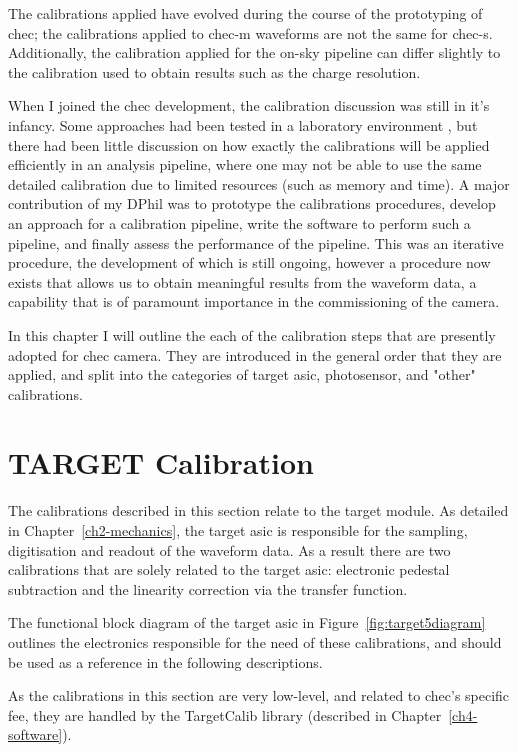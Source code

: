 The calibrations applied have evolved during the course of the prototyping of \gls{chec}; the calibrations applied to \gls{chec-m} waveforms are not the same for \gls{chec-s}. Additionally, the calibration applied for the on-sky pipeline can differ slightly to the calibration used to obtain results such as the charge resolution.

When I joined the \gls{chec} development, the calibration discussion was still in it's infancy. Some approaches had been tested in a laboratory environment \cite{Bechtol2012}, but there had been little discussion on how exactly the calibrations will be applied efficiently in an analysis pipeline, where one may not be able to use the same detailed calibration due to limited resources (such as memory and time). A major contribution of my DPhil was to prototype the calibrations procedures, develop an approach for a calibration pipeline, write the software to perform such a pipeline, and finally assess the performance of the pipeline. This was an iterative procedure, the development of which is still ongoing, however a procedure now exists that allows us to obtain meaningful results from the waveform data, a capability that is of paramount importance in the commissioning of the camera.

In this chapter I will outline the each of the calibration steps that are presently adopted for \gls{chec} camera. They are introduced in the general order that they are applied, and split into the categories of \gls{target} \gls{asic}, photosensor, and "other" calibrations.

\section{TARGET Calibration}

The calibrations described in this section relate to the \gls{target} module. As detailed in Chapter~\ref{ch2-mechanics}, the \gls{target} \gls{asic} is responsible for the sampling, digitisation and readout of the waveform data. As a result there are two calibrations that are solely related to the \gls{target} \gls{asic}: electronic pedestal subtraction and the linearity correction via the transfer function. 

The functional block diagram of the \gls{target} \gls{asic} in Figure~\ref{fig:target5diagram} outlines the electronics responsible for the need of these calibrations, and should be used as a reference in the following descriptions.

As the calibrations in this section are very low-level, and related to \gls{chec}'s specific \gls{fee}, they are handled by the TargetCalib library (described in Chapter~\ref{ch4-software}).

